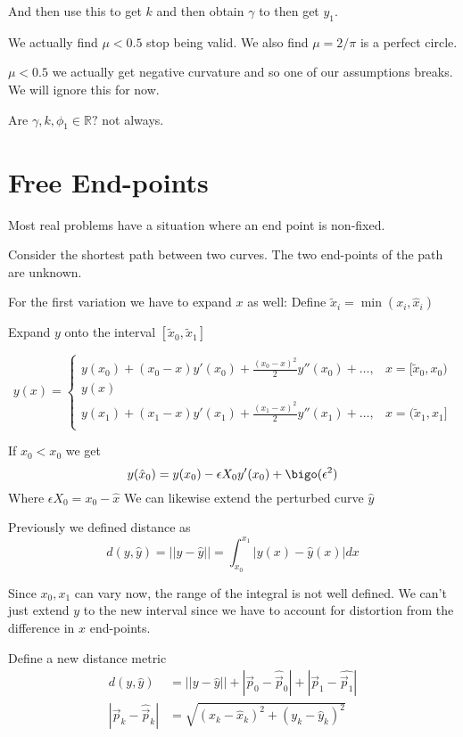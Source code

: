 \documentclass{E:/Documents/Latex/myassignment}
\begin{document}
And then use this to get $k$ and then obtain $\gamma$ to then get $y_1$.

We actually find $\mu < 0.5$ stop being valid. We also find $\mu = 2/\pi$ is a perfect circle.

$\mu < 0.5$ we actually get negative curvature and so one of our assumptions breaks. We will ignore this for now.


Are $\gamma,k,\phi_1 \in \mathbb{R}?$ not always. 




\section{Free End-points}
Most real problems have a situation where an end point is non-fixed.

Consider the shortest path between two curves. The two end-points of the path are unknown.


For the first variation we have to expand $x$ as well: 
Define $\tilde{x}_i = \min(x_i,\hat{x}_i)$

Expand $y$ onto the interval $[\tilde{x}_0, \tilde{x}_1]$

\[y(x) = \begin{cases}
	y(x_0) + (x_0-x)y'(x_0) + \frac{(x_0-x)^2}{2} y''(x_0) + \ldots, & x = [\tilde{x}_0, x_0)\\
	y(x)\\
	y(x_1) + (x_1-x)y'(x_1) + \frac{(x_1-x)^2}{2} y''(x_1) + \ldots, & x = (\tilde{x}_1, x_1]\\
\end{cases}\]

If $\hat{x}_0 < x_0$ we get
\[y(\hat{x}_0) = y(x_0) - \epsilon X_0 y'(x_0) + \bigo(\epsilon^2)\]
Where $\epsilon X_0 = x_0 - \hat{x}$
We can likewise extend the perturbed curve $\hat{y}$

Previously we defined distance as
\[d(y,\hat{y}) = ||y - \hat{y}|| = \int_{x_0}^{x_1} |y(x) - \hat{y}(x)| dx\]

Since $x_0,x_1$ can vary now, the range of the integral is not well defined. We can't just extend $y$ to the new interval since we have to account for distortion from the difference in $x$ end-points.

Define a new distance metric
\begin{align*}
	d(y,\hat{y}) &= ||y-\hat{y}|| + |\vec p_0 - \hat{\vec p}_0| + |\vec p_1 - \hat{\vec p_1}|\\
	|\vec p_k - \hat{\vec p}_k| &= \sqrt{(x_k - \hat{x}_k)^2 + (y_k - \hat{y}_k)^2}
\end{align*}
\end{document}
